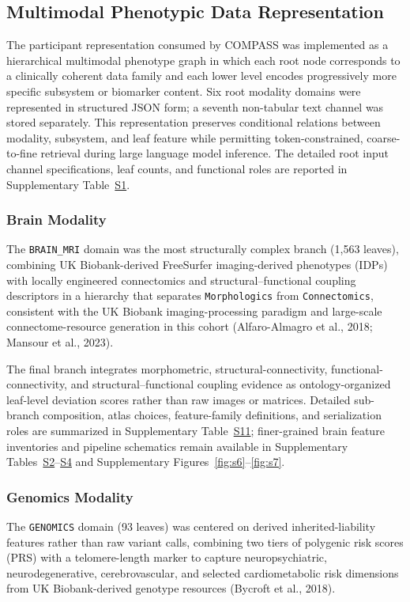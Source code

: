 \documentclass[11pt,a4paper,twoside]{article}
\begin{document}
\subsection{Multimodal Phenotypic Data Representation}
The participant representation consumed by COMPASS was implemented as a hierarchical multimodal phenotype graph in which each root node corresponds to a clinically coherent data family and each lower level encodes progressively more specific subsystem or biomarker content. Six root modality domains were represented in structured JSON form; a seventh non-tabular text channel was stored separately. This representation preserves conditional relations between modality, subsystem, and leaf feature while permitting token-constrained, coarse-to-fine retrieval during large language model inference. The detailed root input channel specifications, leaf counts, and functional roles are reported in Supplementary Table~\hyperref[tab:s1]{S1}.

\subsubsection{Brain Modality}
The \texttt{BRAIN\_{\allowbreak}MRI} domain was the most structurally complex branch (1,563 leaves), combining UK Biobank-derived FreeSurfer imaging-derived phenotypes (IDPs) with locally engineered connectomics and structural--functional coupling descriptors in a hierarchy that separates \texttt{Morphologics} from \texttt{Connectomics}, consistent with the UK Biobank imaging-processing paradigm and large-scale connectome-resource generation in this cohort (Alfaro-Almagro et al., 2018; Mansour et al., 2023).

The final branch integrates morphometric, structural-connectivity, functional-connectivity, and structural--functional coupling evidence as ontology-organized leaf-level deviation scores rather than raw images or matrices. Detailed sub-branch composition, atlas choices, feature-family definitions, and serialization roles are summarized in Supplementary Table~\hyperref[tab:s11]{S11}; finer-grained brain feature inventories and pipeline schematics remain available in Supplementary Tables~\hyperref[tab:s2]{S2}--\hyperref[tab:s4]{S4} and Supplementary Figures~\ref{fig:s6}--\ref{fig:s7}.

\subsubsection{Genomics Modality}
The \texttt{GENOMICS} domain (93 leaves) was centered on derived inherited-liability features rather than raw variant calls, combining two tiers of polygenic risk scores (PRS) with a telomere-length marker to capture neuropsychiatric, neurodegenerative, cerebrovascular, and selected cardiometabolic risk dimensions from UK Biobank-derived genotype resources (Bycroft et al., 2018).
\end{document}
